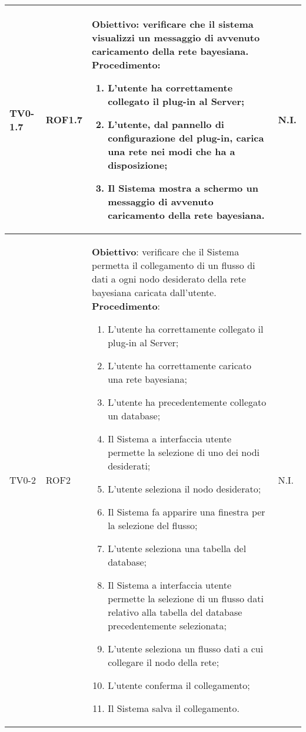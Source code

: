 \begin{longtable}{|C{.15\textwidth}|C{.13\textwidth}|m{.52\textwidth}|C{.08\textwidth}|}
TV0-1.7 & ROF1.7 &
	\textbf{Obiettivo}: verificare che il sistema visualizzi un messaggio di avvenuto caricamento della rete bayesiana. \newline
	\textbf{Procedimento}:
	\begin{enumerate}
		\item L'utente ha correttamente collegato il plug-in al Server;
		\item L'utente, dal pannello di configurazione del plug-in, carica una rete nei modi che ha a disposizione;
		\item Il Sistema mostra a schermo un messaggio di avvenuto caricamento della rete bayesiana.
	\end{enumerate} & N.I. \\
\hline

TV0-2 & ROF2 &
	\textbf{Obiettivo}: verificare che il Sistema permetta il collegamento di un flusso di dati a ogni nodo desiderato della rete bayesiana caricata dall'utente. \newline
	\textbf{Procedimento}:
	\begin{enumerate}
		\item L'utente ha correttamente collegato il plug-in al Server;
		\item L'utente ha correttamente caricato una rete bayesiana;
		\item L'utente ha precedentemente collegato un database;
		\item Il Sistema a interfaccia utente permette la selezione di uno dei nodi desiderati;
		\item L'utente seleziona il nodo desiderato;
		\item Il Sistema fa apparire una finestra per la selezione del flusso;
		\item L'utente seleziona una tabella del database;
		\item Il Sistema a interfaccia utente permette la selezione di un flusso dati relativo alla tabella del database precedentemente selezionata;
		\item L'utente seleziona un flusso dati a cui collegare il nodo della rete;
		\item L'utente conferma il collegamento;
		\item Il Sistema salva il collegamento.
	\end{enumerate}
	& N.I. \\
\hline


\end{longtable}
